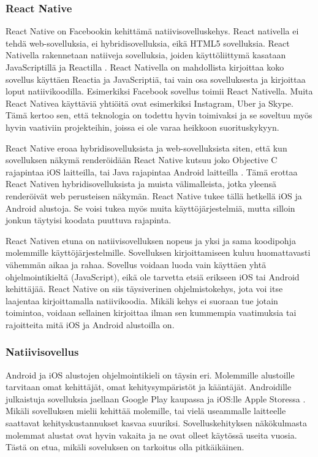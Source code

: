 \documentclass{tktltiki}
\begin{document}
\subsubsection{React Native}

React Native on Facebookin kehittämä natiivisovelluskehys. React nativella ei tehdä web-sovelluksia, ei hybridisovelluksia, eikä HTML5 sovelluksia. React Nativella rakennetaan natiiveja sovelluksia, joiden käyttöliittymä kasataan JavaScriptillä ja Reactilla \cite{Facebook}. React Nativella on mahdollista kirjoittaa koko sovellus käyttäen Reactia ja JavaScriptiä, tai vain osa sovelluksesta ja kirjoittaa loput natiivikoodilla. Esimerkiksi Facebook sovellus toimii React Nativella. Muita React Nativea käyttäviä yhtiöitä ovat esimerkiksi Instagram, Uber ja Skype. Tämä kertoo sen, että teknologia on todettu hyvin toimivaksi ja se soveltuu myös hyvin vaativiin projekteihin, joissa ei ole varaa heikkoon suorituskykyyn.

React Native eroaa hybridisovelluksista ja web-sovelluksista siten, että kun sovelluksen näkymä renderöidään React Native kutsuu joko Objective C rajapintaa iOS laitteilla, tai Java rajapintaa Android laitteilla \cite{Aggarwal}. Tämä erottaa React Nativen hybridisovelluksista ja muista välimalleista, jotka yleensä renderöivät web perusteisen näkymän. React Native tukee tällä hetkellä iOS ja Android alustoja. Se voisi tukea myös muita käyttöjärjestelmiä, mutta silloin jonkun täytyisi koodata puuttuva rajapinta.  

React Nativen etuna on natiivisovelluksen nopeus ja yksi ja sama koodipohja molemmille käyttöjärjestelmille. Sovelluksen kirjoittamiseen kuluu huomattavasti vähemmän aikaa ja rahaa. Sovellus voidaan luoda vain käyttäen yhtä ohjelmointikieltä (JavaScript), eikä ole tarvetta etsiä erikseen iOS tai Android kehittäjää. React Native on siis täysiverinen ohjelmistokehys, jota voi itse laajentaa kirjoittamalla natiivikoodia. Mikäli kehys ei suoraan tue jotain toimintoa, voidaan sellainen kirjoittaa ilman sen kummempia vaatimuksia tai rajoitteita mitä iOS ja Android alustoilla on.

\subsubsection{Natiivisovellus}

Android ja iOS alustojen ohjelmointikieli on täysin eri. Molemmille alustoille tarvitaan omat kehittäjät, omat kehitysympäristöt ja kääntäjät. Androidille julkaistuja sovelluksia jaellaan Google Play kaupassa ja iOS:lle Apple Storessa \cite{Haikonen}. Mikäli sovelluksen mielii kehittää molemille, tai vielä useammalle laitteelle saattavat kehityskustannukset kasvaa suuriksi. Sovelluskehityksen näkökulmasta molemmat alustat ovat hyvin vakaita ja ne ovat olleet käytössä useita vuosia. Tästä on etua, mikäli soveluksen on tarkoitus olla pitkäikäinen.  
\end{document}
